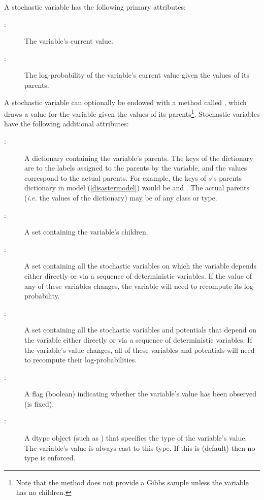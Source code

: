 \documentclass[]{jss}
\begin{document}
A stochastic variable has the following primary attributes:
\begin{description}
    \item[:] The variable's current value.
    \item[:] The log-probability of the variable's current value given the values of its parents.
\end{description}
A stochastic variable can optionally be endowed with a method called , which draws a value for the variable given the values of its parents\footnote{Note that the  method does not provide a Gibbs sample unless the variable has no children.}. Stochastic variables have the following additional attributes:
\begin{description}
    \item[:] A dictionary containing the variable's parents. The keys of the dictionary are to the labels assigned to the parents by the variable, and the values correspond to the actual parents. For example, the keys of $s$'s parents dictionary in model (\ref{disastermodel}) would be  and . The actual parents (\emph{i.e.} the values of the dictionary) may be of any class or type.
    \item[:] A set containing the variable's children.
    \item[:] A set containing all the stochastic variables on which the variable depends either directly or via a sequence of deterministic variables. If the value of any of these variables changes, the variable will need to recompute its log-probability.
    \item[:] A set containing all the stochastic variables and potentials that depend on the variable either directly or via a sequence of deterministic variables. If the variable's value changes, all of these variables and potentials will need to recompute their log-probabilities.
    \item[:] A flag (boolean) indicating whether the variable's value has been observed (is fixed).
    \item[:] A  dtype object (such as ) that specifies the type of the variable's value. The variable's value is always cast to this type. If this is  (default) then no type is enforced.
\end{description}
\end{document}
